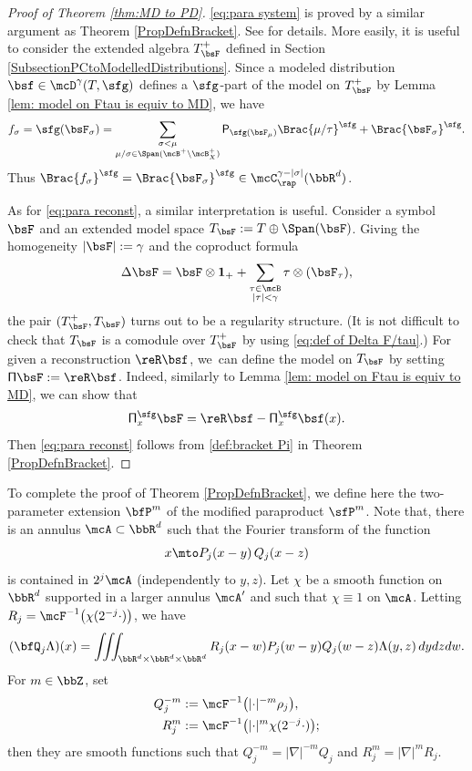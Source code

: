 \begin{proof}[Proof of Theorem \ref{thm:MD to PD}]
\eqref{eq:para system} is proved by a similar argument as Theorem \ref{PropDefnBracket}.
See \cite[Th.\,14]{BH} for details.
More easily, it is useful to consider the extended algebra $T_{\bsF}^+$ defined in Section \ref{SubsectionPCtoModelledDistributions}.
Since a modeled distribution $\bsf\in\mcD^\gamma(T,\sfg)$ defines a $\sfg$-part of the model on $T_{\bsF}^+$ by Lemma \ref{lem: model on Ftau is equiv to MD}, we have
\[
f_\sigma=\sfg(\bsF_\sigma)=\sum_{\substack{\sigma<\mu \\ \mu/\sigma\in\Span (\mcB^+\setminus\mcB_X^+)}}{\sf P}_{\sfg(\bsF_\mu)}\Brac{\mu/\tau}^{\sfg}+\Brac{\bsF_\sigma}^{\sfg}.
\]
Thus $\Brac{f_\sigma}^{\sfg}=\Brac{\bsF_\sigma}^{\sfg}\in\mcC_{\rap}^{\gamma-|\sigma|}(\bbR^d)$.

As for \eqref{eq:para reconst}, a similar interpretation is useful. Consider a symbol $\bsF$ and an extended model space $T_{\bsF}:=T\oplus\Span (\bsF)$. Giving the homogeneity $|\bsF|:=\gamma$ and the coproduct formula
\[
\Delta\bsF=\bsF\otimes{\bf1}_++\sum_{\substack{\tau\in\mcB\\|\tau|<\gamma}}\tau\otimes(\bsF_\tau),
\]
the pair $(T_{\bsF}^+,T_{\bsF})$ turns out to be a regularity structure. (It is not difficult to check that $T_{\bsF}$ is a comodule over $T_{\bsF}^+$ by using \eqref{eq:def of Delta F/tau}.)
For given a reconstruction $\reR\bsf$, we~can define the model on $T_{\bsF}$ by setting ${\sf\Pi}\bsF:=\reR\bsf$. Indeed, similarly to Lemma \ref{lem: model on Ftau is equiv to MD}, we can show that
\[
{\sf\Pi}_x^{\sfg}\bsF=\reR\bsf-{\sf\Pi}_x^{\sfg}\bsf(x).
\]
Then \eqref{eq:para reconst} follows from \eqref{def:bracket Pi} in Theorem \ref{PropDefnBracket}.
\end{proof}

To complete the proof of Theorem \ref{PropDefnBracket}, we define here the two-parameter extension $\bfP^m$ of the modified paraproduct $\sfP^m$. Note that, there is an annulus $\mcA\subset\bbR^d$ such that the Fourier transform of the function
\[
x\mto P_j(x-y)\,Q_j(x-z)
\]
is contained in $2^j\mcA$ (independently to $y,z$). Let $\chi$ be a smooth function on $\bbR^d$ supported in a larger annulus $\mcA'$ and such that $\chi\equiv1$ on $\mcA$. Letting $R_j=\mcF^{-1}\bigl(\chi(2^{-j}\cdot)\bigr)$, we have
\[
(\bfQ_j \Lambda)(x)=\iiint_{\bbR^d\times\bbR^d\times\bbR^d} R_j(x-w)P_j(w-y)Q_j(w-z) \Lambda(y,z)\,dydzdw.
\]
For $m\in\bbZ$, set
\begin{equation*} \begin{split}
Q_j^{-m} &:= \mcF^{-1}\bigl(|{\cdot}|^{-m}\rho_j\bigr), \\
R_j^m &:= \mcF^{-1}\bigl(|{\cdot}|^m\chi(2^{-j}\cdot)\bigr);
\end{split} \end{equation*}
then they are smooth functions such that $Q_j^{-m} = |\nabla|^{-m}Q_j$ and $R_j^m = |\nabla|^m R_j$.

